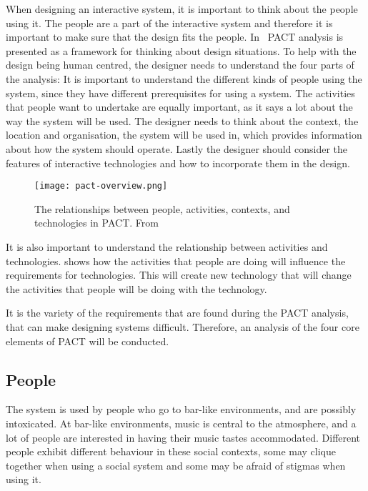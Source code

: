 When designing an interactive system, it is important to think about the people using it. The people are a part of the interactive system and therefore it is important to make sure that the design fits the people. In~\cite{benyon2013designing} PACT analysis is presented as a framework for thinking about design situations. To help with the design being human centred, the designer needs to understand the four parts of the analysis: It is important to understand the different kinds of people using the system, since they have different prerequisites for using a system. The activities that people want to undertake are equally important, as it says a lot about the way the system will be used. The designer needs to think about the context, the location and organisation, the system will be used in, which provides information about how the system should operate. Lastly the designer should consider the features of interactive technologies and how to incorporate them in the design.

\begin{figure}[hbtp]
  \centering
  \texttt{[image: pact-overview.png]}
  \caption[PACT overview.]{The relationships between people, activities, contexts, and technologies in PACT. From~\cite{benyon2013designing}}
  \label{fig:pact-overview}
\end{figure}

It is also important to understand the relationship between activities and technologies.  shows how the activities that people are doing will influence the requirements for technologies. This will create new technology that will change the activities that people will be doing with the technology.

It is the variety of the requirements that are found during the PACT analysis, that can make designing systems difficult. Therefore, an analysis of the four core elements of PACT will be conducted.


\subsection{People}
\label{sub:pact_people}

The system is used by people who go to bar-like environments, and are possibly intoxicated. At bar-like environments, music is central to the atmosphere, and a lot of people are interested in having their music tastes accommodated. Different people exhibit different behaviour in these social contexts, some may clique together when using a social system and some may be afraid of stigmas when using it.

